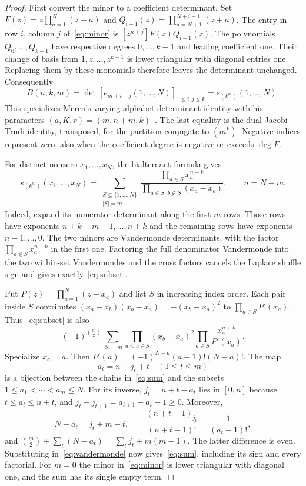 \documentclass[11pt]{article}
\newcommand{\Schur}{s}
\begin{document}
\begin{proof}
First convert the minor to a coefficient determinant. Set
$F(z)=z\prod_{a=1}^{N}(z+a)$ and
$Q_{i-1}(z)=\prod_{a=N+1}^{N+i-1}(z+a)$.
The entry in row $i$, column $j$ of~\eqref{eq:minor} is
$[z^{n+j}]F(z)Q_{i-1}(z)$.
The polynomials $Q_0,\ldots,Q_{k-1}$ have respective degrees $0,\ldots,k-1$
and leading coefficient one. Their change of basis from $1,z,\ldots,z^{k-1}$
is lower triangular with diagonal entries one. Replacing them by these monomials
therefore leaves the determinant unchanged. Consequently
\begin{equation}\label{eq:elementary}
B(n,k,m)=\det[e_{m+i-j}(1,\ldots,N)]_{1\leq i,j\leq k}
=\Schur_{(k^m)}(1,\ldots,N).
\end{equation}
This specializes Merca's varying-alphabet determinant identity with
his parameters $(a,K,r)=(m,n+m,k)$~\cite[Theorem 2.1 and \S3]{merca}.
The last equality is the dual Jacobi--Trudi identity, transposed, for the
partition conjugate to $(m^k)$. Negative indices represent zero, also when the
coefficient degree is negative or exceeds $\deg F$.

For distinct nonzero $x_1,\ldots,x_N$, the bialternant formula gives
\begin{equation}\label{eq:subset}
\Schur_{(k^m)}(x_1,\ldots,x_N)
=\sum_{\substack{S\subseteq\{1,\ldots,N\}\\|S|=m}}
\frac{\prod_{a\in S}x_a^{n+k}}
{\prod_{a\in S,\,b\notin S}(x_a-x_b)},\qquad n=N-m.
\end{equation}
Indeed, expand its numerator determinant along the first $m$ rows.
Those rows have exponents $n+k+m-1,\ldots,n+k$ and the remaining rows
have exponents $n-1,\ldots,0$. The two minors are Vandermonde determinants,
with the factor $\prod_{a\in S}x_a^{n+k}$ in the first one.
Factoring the full denominator Vandermonde into the two within-set
Vandermondes and the cross factors cancels the Laplace shuffle sign and gives
exactly~\eqref{eq:subset}.

Put $P(z)=\prod_{a=1}^N(z-x_a)$ and list $S$ in increasing index order.
Each pair inside $S$ contributes
$(x_a-x_b)(x_b-x_a)=-(x_b-x_a)^2$ to $\prod_{a\in S}P'(x_a)$.
Thus~\eqref{eq:subset} is also
\begin{equation}\label{eq:vandermonde}
(-1)^{\binom m2}\sum_{|S|=m}
\prod_{a<b\in S}(x_b-x_a)^2
\prod_{a\in S}\frac{x_a^{n+k}}{P'(x_a)}.
\end{equation}
Specialize $x_a=a$. Then
$P'(a)=(-1)^{N-a}(a-1)!(N-a)!$.
The map
\[
a_t=n-j_t+t\quad(1\leq t\leq m)
\]
is a bijection between the chains in~\eqref{eq:sum} and the subsets
$1\leq a_1<\cdots<a_m\leq N$.
For its inverse, $j_t=n+t-a_t$ lies in $[0,n]$ because
$t\leq a_t\leq n+t$, and
$j_t-j_{t+1}=a_{t+1}-a_t-1\geq0$.
Moreover,
\[
N-a_t=j_t+m-t,\qquad
\frac{(n+t-1)_{\underline{j_t}}}{(n+t-1)!}=\frac1{(a_t-1)!},
\]
and
$\binom m2+\sum_t(N-a_t)=\sum_tj_t+m(m-1)$.
The latter difference is even. Substituting in~\eqref{eq:vandermonde} now
gives~\eqref{eq:sum}, including its sign and every factorial.
For $m=0$ the minor in~\eqref{eq:minor} is lower triangular with diagonal one,
and the sum has its single empty term.
\end{proof}
\end{document}
